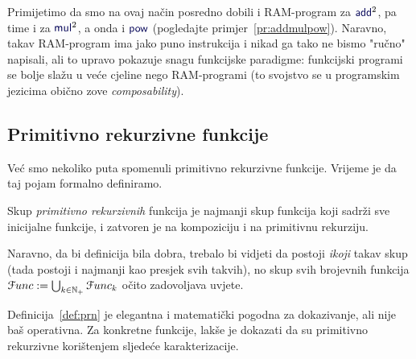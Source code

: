 Primijetimo da smo na ovaj način posredno dobili i RAM-program za $\f{add}^2$, pa time i za $\f{mul}^2$, a onda i $\f{pow}$ (pogledajte primjer~\ref{pr:addmulpow}). Naravno, takav RAM-program ima jako puno instrukcija i nikad ga tako ne bismo "ručno" napisali, ali to upravo pokazuje snagu funkcijske paradigme: funkcijski programi se bolje slažu u veće cjeline nego RAM-programi (to svojstvo se u programskim jezicima obično zove \emph{composability}). 
\subsection{Primitivno rekurzivne funkcije}

Već smo nekoliko puta spomenuli primitivno rekurzivne funkcije. Vrijeme je da taj pojam formalno definiramo.

\begin{definicija}[{name=[primitivno rekurzivne funkcije]}]\label{def:prn}
Skup \emph{primitivno rekurzivnih} funkcija je najmanji skup funkcija koji sadrži sve inicijalne funkcije, i zatvoren je na kompoziciju i na primitivnu rekurziju.
\end{definicija}

Naravno, da bi definicija bila dobra, trebalo bi vidjeti da postoji \emph{ikoji} takav skup (tada postoji i najmanji kao presjek svih takvih), no skup svih brojevnih funkcija $\mathcal Func:=\bigcup_{k\in{\mathbb N}_+}\mathcal Func_k$ očito zadovoljava uvjete.

Definicija~\ref{def:prn} je elegantna i matematički pogodna za dokazivanje, ali nije baš operativna. Za konkretne funkcije, lakše je dokazati da su primitivno rekurzivne korištenjem sljedeće karakterizacije.

